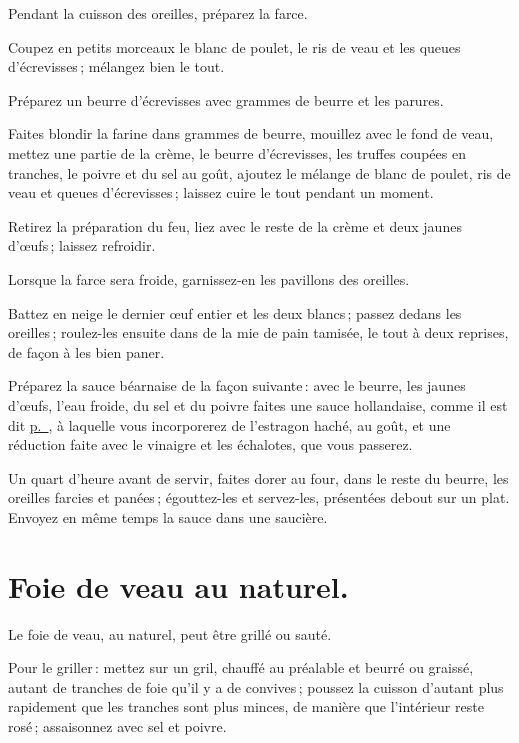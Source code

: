 Pendant la cuisson des oreilles, préparez la farce.

Coupez en petits morceaux le blanc de poulet, le ris de veau et les queues
d'écrevisses ; mélangez bien le tout.

Préparez un beurre d'écrevisses avec {\mmm} grammes de beurre et les parures.

Faites blondir la farine dans {\mmm} grammes de beurre, mouillez avec le fond de
veau, mettez une partie de la crème, le beurre d'écrevisses, les truffes
coupées en tranches, le poivre et du sel au goût, ajoutez le mélange de blanc
de poulet, ris de veau et queues d’écrevisses ; laissez cuire le tout pendant
un moment.

Retirez la préparation du feu, liez avec le reste de la crème et deux jaunes
d'œufs ; laissez refroidir.

Lorsque la farce sera froide, garnissez-en les pavillons des oreilles.

Battez en neige le dernier œuf entier et les deux blancs ; passez dedans les
oreilles ; roulez-les ensuite dans de la mie de pain tamisée, le tout à deux
reprises, de façon à les bien paner.

\label{pg0434} \hypertarget{p0434}{} 
Préparez la sauce béarnaise de la façon suivante : avec
le beurre, les jaunes d'œufs, l'eau froide, du sel et du poivre faites une
sauce hollandaise, comme il est dit \hyperlink{p0362}{p. \pageref{pg0362}},
à laquelle vous incorporerez de l'estragon haché, au goût, et une réduction
faite avec le vinaigre et les échalotes, que vous passerez.

Un quart d'heure avant de servir, faites dorer au four, dans le reste du
beurre, les oreilles farcies et panées ; égouttez-les et servez-les, présentées
debout sur un plat. Envoyez en même temps la sauce dans une saucière.

\section*{\centering Foie de veau au naturel.}
{}

Le foie de veau, au naturel, peut être grillé ou sauté.

Pour le griller : mettez sur un gril, chauffé au préalable et beurré ou
graissé, autant de tranches de foie qu'il y a de convives ; poussez la cuisson
d'autant plus rapidement que les tranches sont plus minces, de manière que
l'intérieur reste rosé ; assaisonnez avec sel et poivre.

